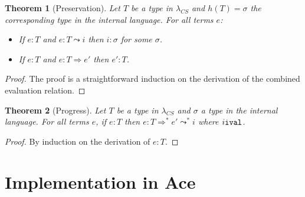 \documentclass[10pt,preprint]{sigplanconf}
\newtheorem{thm}{Theorem}
\theoremstyle{definition}
\newcommand{\strin}[1]{{\tt string\_in #1}}
\newcommand{\str}{ {\tt string} }
\newcommand{\istr}{ {\tt istring} }
\newcommand{\dconvert}{ {\tt dconvert} }
\newcommand{\reduces}{ \Rightarrow }
\newcommand{\ireduces}{ \leadsto }
\newcommand{\lcs}{\lambda_{CS}}
\begin{document}
\begin{thm}[Preservation]
  Let $T$ be a type in $\lcs$ and $h(T)=\sigma$ the corresponding type in the internal language.
  For all terms $e$:
  \begin{itemize}
    \item If $e:T$ and $e:T \ireduces i$ then $i : \sigma$ for some $\sigma$.
    \item If $e:T$ and $e:T \reduces e'$ then $e':T$.
  \end{itemize}
\end{thm}
\begin{proof}
The proof is a straightforward induction on the derivation of the combined evaluation relation.
\end{proof}

\begin{thm}[Progress]
  Let $T$ be a type in $\lcs$ and $\sigma$ a type in the internal language.
  For all terms $e$, if $e:T$ then $e:T \reduces^* e' \ireduces^* i$ where $i {\tt ival}$.
\end{thm}
\begin{proof}
By induction on the derivation of $e:T$.
\end{proof}

\section{Implementation in Ace}
\end{document}
